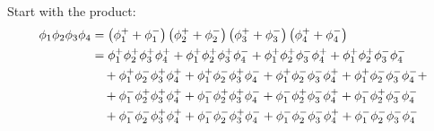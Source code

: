 {Start with the product:
\begin{align}
    \phi_1 \phi_2 \phi_3 \phi_4 &= \left(\phi_1^+ + \phi_1^-\right)\left(\phi_2^+ + \phi_2^-\right)\left(\phi_3^+ + \phi_3^-\right)\left(\phi_4^+ + \phi_4^-\right) \notag \\
    &= \phi_1^+ \phi_2^+ \phi_3^+ \phi_4^++ \phi_1^+ \phi_2^+ \phi_3^+ \phi_4^-+ \phi_1^+ \phi_2^+ \phi_3^- \phi_4^++ \phi_1^+ \phi_2^+ \phi_3^- \phi_4^- \notag \\
    &\quad + \phi_1^+ \phi_2^- \phi_3^+ \phi_4^++\phi_1^+ \phi_2^- \phi_3^+ \phi_4^-+ \phi_1^+ \phi_2^- \phi_3^- \phi_4^++ \phi_1^+ \phi_2^- \phi_3^- \phi_4^-+ \notag\\ &\quad +\phi_1^- \phi_2^+ \phi_3^+ \phi_4^++ \phi_1^- \phi_2^+ \phi_3^+ \phi_4^-+ \phi_1^- \phi_2^+ \phi_3^- \phi_4^++ \phi_1^- \phi_2^+ \phi_3^- \phi_4^- \notag \\
    &\quad + \phi_1^- \phi_2^- \phi_3^+ \phi_4^++ \phi_1^- \phi_2^- \phi_3^+ \phi_4^-+ \phi_1^- \phi_2^- \phi_3^- \phi_4^+ + \phi_1^- \phi_2^- \phi_3^- \phi_4^- \notag
\end{align}


}
